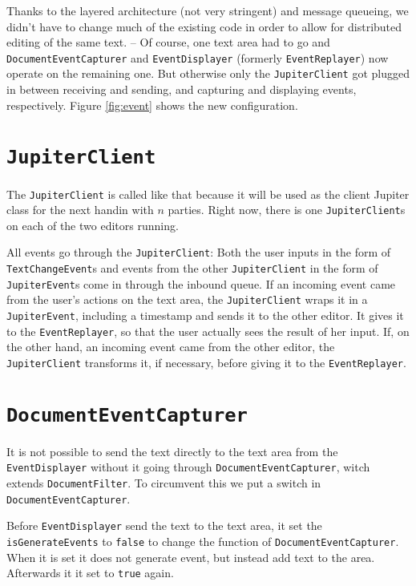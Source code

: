 \documentclass[a4paper,draft,12pt,oneside,article,table]{memoir}
\newcommand{\srcpath}{../ex09/src/main/java/ddist}
\newcommand{\inmnt}[3]{\vspace{1em}\noindent\texttt{\color{gray}File: #3}\vspace{-1em}\inputminted[tabsize=4,firstline=#1,firstnumber=#1,lastline=#2,linenos]{java}{\srcpath/#3}}
\newcommand{\mil}[1]{\texttt{#1}}
\begin{document}
Thanks to the layered architecture (not very stringent) and message
queueing, we didn't have to change much of the existing code in order to
allow for distributed editing of the same text. -- Of course, one text
area had to go and \mil{DocumentEventCapturer} and \mil{EventDisplayer}
(formerly \mil{EventReplayer}) now operate on the remaining one.
But otherwise only the \mil{JupiterClient} got plugged in between
receiving and sending, and capturing and displaying events,
respectively. Figure \ref{fig:event} shows the new configuration.


\section{\mil{JupiterClient}}

The \mil{JupiterClient} is called like that because it will be used as
the client Jupiter class for the next handin with $n$ parties. Right
now, there is one \mil{JupiterClient}s on each of the two editors
running.

All events go through the \mil{JupiterClient}: Both the user inputs in the
form of \mil{TextChangeEvent}s and events from the other
\mil{JupiterClient} in the form of \mil{JupiterEvent}s come in through
the inbound queue.  If an incoming event came from the user's actions on
the text area, the \mil{JupiterClient} wraps it in a \mil{JupiterEvent},
including a timestamp and sends it to the other editor. It gives it
to the \mil{EventReplayer}, so that the user actually sees the result of
her input. If, on the other hand, an incoming event came from the other
editor, the \mil{JupiterClient} transforms it, if necessary, before
giving it to the \mil{EventReplayer}.


\section{\mil{DocumentEventCapturer}}
It is not possible to send the text directly to the text area from the
\mil{EventDisplayer} without it going through
\mil{DocumentEventCapturer}, witch extends \mil{DocumentFilter}. To
circumvent this we put a switch in \mil{DocumentEventCapturer}.

Before \mil{EventDisplayer} send the text to the text area, it set the
\mil{isGenerateEvents} to \mil{false} to change the function of
\mil{DocumentEventCapturer}. When it is set it does not generate
event, but instead add text to the area. Afterwards it it set to
\mil{true} again.
\end{document}
